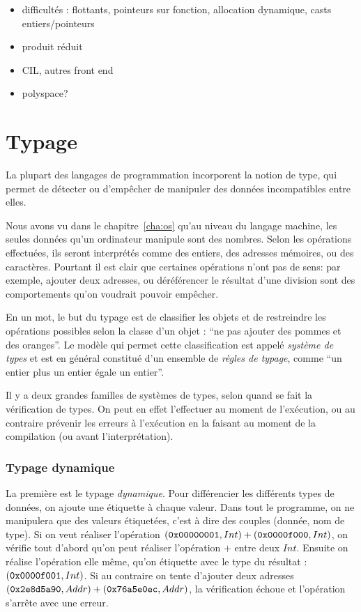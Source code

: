 \begin{itemize}
\item difficultés : flottants, pointeurs sur fonction, allocation dynamique,
  casts entiers/pointeurs
\item produit réduit
\item CIL, autres front end
\item polyspace?
\end{itemize}

\section{Typage}

La plupart des langages de programmation incorporent la notion de type, qui
permet de détecter ou d'empêcher de manipuler des données incompatibles entre
elles.

Nous avons vu dans le chapitre~\ref{cha:os} qu'au niveau du langage machine, les
seules données qu'un ordinateur manipule sont des nombres. Selon les opérations
effectuées, ils seront interprétés comme des entiers, des adresses mémoires, ou
des caractères. Pourtant il est clair que certaines opérations n'ont pas de
sens: par exemple, ajouter deux adresses, ou déréférencer le résultat d'une
division sont des comportements qu'on voudrait pouvoir empêcher.

En un mot, le but du typage est de classifier les objets et de restreindre les
opérations possibles selon la classe d'un objet : ``ne pas ajouter des pommes et
des oranges''. Le modèle qui permet cette classification est appelé
\emph{système de types} et est en général constitué d'un ensemble de
\emph{règles de typage}, comme ``un entier plus un entier égale un entier''.

Il y a deux grandes familles de systèmes de types, selon quand se fait la
vérification de types. On peut en effet l'effectuer au moment de l'exécution, ou
au contraire prévenir les erreurs à l'exécution en la faisant au moment de la
compilation (ou avant l'interprétation).

\subsubsection{Typage dynamique}

La première est le typage \emph{dynamique}. Pour différencier les différents
types de données, on ajoute une étiquette à chaque valeur. Dans tout le
programme, on ne manipulera que des valeurs étiquetées, c'est à dire des couples
(donnée, nom de type). Si on veut réaliser l'opération $(\texttt{0x00000001}, Int) +
(\texttt{0x0000f000}, Int)$, on vérifie tout d'abord qu'on peut réaliser l'opération
$+$ entre deux $Int$. Ensuite on réalise l'opération elle même, qu'on étiquette
avec le type du résultat : $(\texttt{0x0000f001}, Int)$. Si au contraire on tente
d'ajouter deux adresses $(\texttt{0x2e8d5a90}, Addr) + (\texttt{0x76a5e0ec}, Addr)$, la
vérification échoue et l'opération s'arrête avec une erreur.

